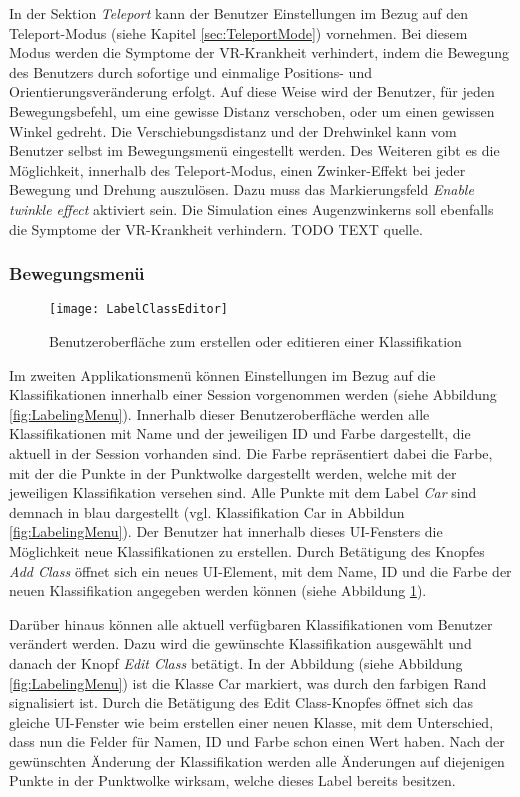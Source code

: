 In der Sektion \textit{Teleport} kann der Benutzer Einstellungen im Bezug auf den Teleport-Modus (siehe Kapitel \ref{sec:TeleportMode}) vornehmen. Bei diesem Modus werden die Symptome der VR-Krankheit verhindert, indem die Bewegung des Benutzers durch sofortige und einmalige Positions- und Orientierungsveränderung erfolgt. Auf diese Weise wird der Benutzer, für jeden Bewegungsbefehl, um eine gewisse Distanz verschoben, oder um einen gewissen Winkel gedreht. Die Verschiebungsdistanz und der Drehwinkel kann vom Benutzer selbst im Bewegungsmenü eingestellt werden. Des Weiteren gibt es die Möglichkeit, innerhalb des Teleport-Modus, einen Zwinker-Effekt bei jeder Bewegung und Drehung auszulösen. Dazu muss das Markierungsfeld \textit{Enable twinkle effect} aktiviert sein. Die Simulation eines Augenzwinkerns soll ebenfalls die Symptome der VR-Krankheit verhindern. TODO TEXT quelle.\\


\subsubsection{Bewegungsmenü}

\begin{figure}%
	\centering
    \texttt{[image: LabelClassEditor]}
    \caption{Benutzeroberfläche zum erstellen oder editieren einer Klassifikation}
    \label{fig:LabelClassEditor}
\end{figure}
Im zweiten Applikationsmenü können Einstellungen im Bezug auf die Klassifikationen innerhalb einer Session vorgenommen werden (siehe Abbildung \ref{fig:LabelingMenu}). Innerhalb dieser Benutzeroberfläche werden alle Klassifikationen mit Name und der jeweiligen ID und Farbe dargestellt, die aktuell in der Session vorhanden sind. Die Farbe repräsentiert dabei die Farbe, mit der die Punkte in der Punktwolke dargestellt werden, welche mit der jeweiligen Klassifikation versehen sind. Alle Punkte mit dem Label \textit{Car} sind demnach in blau dargestellt (vgl. Klassifikation Car in Abbildun \ref{fig:LabelingMenu}). Der Benutzer hat innerhalb dieses UI-Fensters die Möglichkeit neue Klassifikationen zu erstellen. Durch Betätigung des Knopfes \textit{Add Class} öffnet sich ein neues UI-Element, mit dem Name, ID und die Farbe der neuen Klassifikation angegeben werden können (siehe Abbildung \ref{fig:LabelClassEditor}). 

Darüber hinaus können alle aktuell verfügbaren Klassifikationen vom Benutzer verändert werden. Dazu wird die gewünschte Klassifikation ausgewählt und danach der Knopf \textit{Edit Class} betätigt. In der Abbildung (siehe Abbildung \ref{fig:LabelingMenu}) ist die Klasse Car markiert, was durch den farbigen Rand signalisiert ist. Durch die Betätigung des Edit Class-Knopfes öffnet sich das gleiche UI-Fenster wie beim erstellen einer neuen Klasse, mit dem Unterschied, dass nun die Felder für Namen, ID und Farbe schon einen Wert haben. Nach der gewünschten Änderung der Klassifikation werden alle Änderungen auf diejenigen Punkte in der Punktwolke wirksam, welche dieses Label bereits besitzen. 

